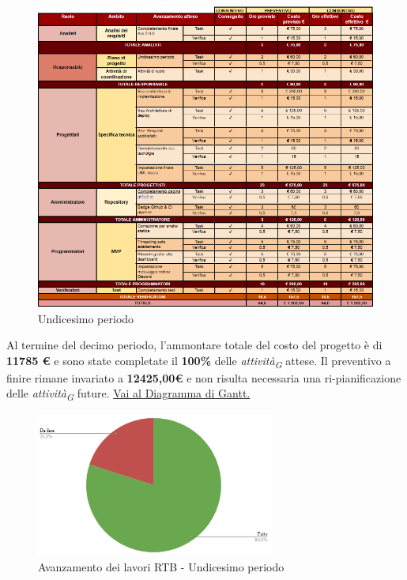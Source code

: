 \begin{figure}[H]
    \centering
    \includegraphics[height=0.9\textwidth]{../Images/periodo11.PNG}
    \caption{Undicesimo periodo}
    \label{fig:Undicesimo_periodo}
\end{figure}

Al termine del decimo periodo, l'ammontare totale del costo del progetto è di \textbf{11785 \euro} e sono state completate il \textbf{100\%} delle \textit{attività}\textsubscript{\textit{G}} attese.
Il preventivo a finire rimane invariato a \textbf{12425,00\euro} e non risulta necessaria una ri-pianificazione delle \textit{attività}\textsubscript{\textit{G}} future.
\href{https://github.com/orgs/ByteOps-swe/projects/3/views/1?sortedBy%5Bdirection%5D=asc&sortedBy%5BcolumnId%5D=64182560}{Vai al Diagramma di Gantt.}

\begin{figure}[H]
    \centering
    \begin{minipage}[b]{0.70\textwidth}
        \centering
        \includegraphics[width=0.7\textwidth]{../Images/avanzamento11Periodo.png}
        \caption{Avanzamento dei lavori RTB - Undicesimo periodo}
        \label{fig:Avanzamento_RTB_11}
    \end{minipage}
\end{figure}

